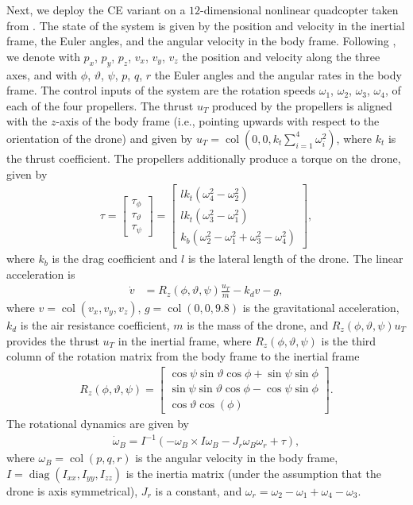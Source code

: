 \documentclass[journal,twoside,web,final]{ieeecolor}
\theoremstyle{definition}
\begin{document}
Next, we deploy the CE variant on a $12$-dimensional nonlinear quadcopter taken from \cite{abdulkareem2022modeling}.
The state of the system is given by the position and velocity in the inertial frame, the Euler angles, and the angular velocity in the body frame.
Following \cite{abdulkareem2022modeling}, we denote with $p_x$, $p_y$, $p_z$, $v_x$, $v_y$, $v_z$ the position and velocity along the three axes,
and with $\phi$, $\vartheta$, $\psi$, $p$, $q$, $r$ the Euler angles and the angular rates in the body frame.
The control inputs of the system are the rotation speeds $\omega_1$, $\omega_2$, $\omega_3$, $\omega_4$, of each of the four propellers.
The thrust $u_T$ produced by the propellers is aligned with the $z$-axis of the body frame (i.e., pointing upwards with respect to the orientation of the drone) and given by $u_T=\operatorname*{col}(0,0,k_t \sum_{i=1}^{4} \omega_i^2)$, where $k_t$ is the thrust coefficient.
The propellers additionally produce a torque on the drone, given by
\begin{align*}
\tau = \begin{bmatrix}
\tau_\phi \\ \tau_\vartheta \\ \tau_\psi
\end{bmatrix} = 
\begin{bmatrix}
l k_t (\omega_4^2-\omega_2^2)\\ lk_t (\omega_3^2-\omega_1^2) \\ k_b (\omega_2^2-\omega_1^2+\omega_3^2-\omega_4^2)
\end{bmatrix},
\end{align*}
where $k_b$ is the drag coefficient and $l$ is the lateral length of the drone.
The linear acceleration is
\begin{align*}
\dot{v} & = R_z(\phi,\vartheta,\psi) \frac{u_T}{m} - k_d v - g,
\end{align*}
where $v=\operatorname*{col}(v_x,v_y,v_z)$, $g=\operatorname*{col}(0,0,9.8)$ is the gravitational acceleration, $k_d$ is the air resistance coefficient, $m$ is the mass of the drone, and $R_z(\phi,\vartheta,\psi) u_T$ provides the thrust $u_T$ in the inertial frame, where $R_z(\phi,\vartheta,\psi)$ is the third column of the rotation matrix from the body frame to the inertial frame
\begin{align*}
R_z(\phi,\vartheta,\psi) = \begin{bmatrix}
\cos{\psi}\sin{\vartheta}\cos{\phi} + \sin{\psi}\sin {\phi} \\
\sin{\psi}\sin{\vartheta}\cos{\phi} - \cos{\psi}\sin {\phi} \\
\cos {\vartheta} \cos (\phi) 
\end{bmatrix}.
\end{align*}
The rotational dynamics are given by
\begin{align*}
\dot{\omega}_B = I^{-1} (- \omega_B \times I \omega_B - J_r \omega_B \omega_r + \tau),
\end{align*}
where $\omega_B=\operatorname*{col}(p,q,r)$ is the angular velocity in the body frame, $I=\operatorname*{diag}(I_{xx},I_{yy},I_{zz})$ is the inertia matrix (under the assumption that the drone is axis symmetrical), $J_r$ is a constant, and $\omega_r=\omega_2-\omega_1+\omega_4-\omega_3$.
\end{document}
